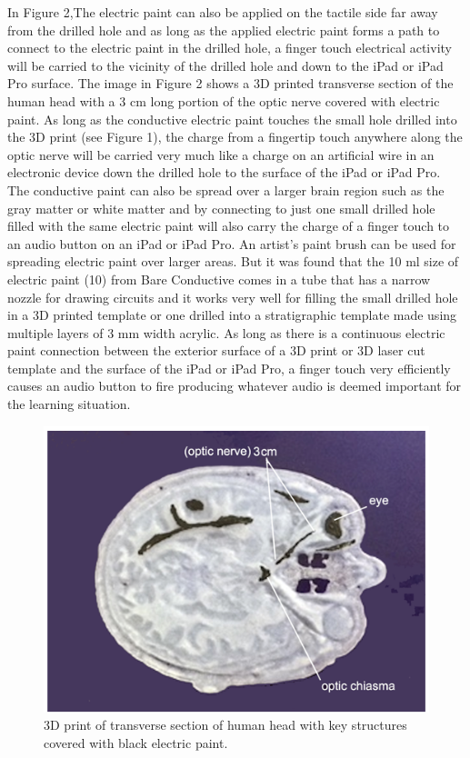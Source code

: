 \documentclass[11.5pt]{sig-alternate} %
\begin{document}
\begin{large}
\begin{figure}[h]
\end{figure}

In Figure 2,The electric paint can also be applied on the tactile side far away from the drilled hole and as long as the applied electric paint forms a path to connect to the electric paint in the drilled hole, a finger touch electrical activity will be carried to the vicinity of the drilled hole and down to the iPad or iPad Pro surface.  The image in Figure 2 shows a 3D printed transverse section of the human head with a 3 cm long portion of the optic nerve covered with electric paint.  As long as the conductive electric paint touches the small hole drilled into the 3D print (see Figure 1), the charge from a fingertip touch anywhere along the optic nerve will be carried very much like a charge on an artificial wire in an electronic device down the drilled hole to the surface of the iPad or iPad Pro.  The conductive paint can also be spread over a larger brain region such as the gray matter or white matter and by connecting to just one small drilled hole filled with the same electric paint will also carry the charge of a finger touch to an audio button on an iPad or iPad Pro.  An artist’s paint brush can be used for spreading electric paint over larger areas.  But it was found that the 10 ml size of electric paint (10) from Bare Conductive comes in a tube that has a narrow nozzle for drawing circuits and it works very well for filling the small drilled hole in a 3D printed template or one drilled into a stratigraphic template made using multiple layers of 3 mm width acrylic.  As long as there is a continuous electric paint connection between the exterior surface of a 3D print or 3D laser cut template and the surface of the iPad or iPad Pro, a finger touch very efficiently causes an audio button to fire producing whatever audio is deemed important for the learning situation.

\begin{figure}
    \centering
    \includegraphics[width=1\linewidth]{fig 2.png}
    \caption{3D print of transverse section of human head with key structures covered with black electric paint.}
\end{figure}


\end{large}
\end{document}
